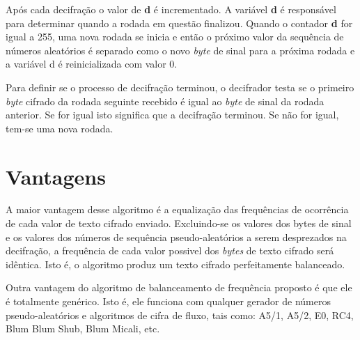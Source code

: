 Após cada decifração o valor de \textbf{d} é incrementado. A variável \textbf{d} é responsável para determinar quando a rodada em questão finalizou. Quando o contador \textbf{d} for igual a 255, uma nova rodada se inicia e então o próximo valor da sequência de números aleatórios é separado como o novo \textit{byte} de sinal para a próxima rodada e a variável d é reinicializada com valor 0.

Para definir se o processo de decifração terminou, o decifrador testa se o primeiro \textit{byte} cifrado da rodada seguinte recebido é igual ao \textit{byte} de sinal da rodada anterior. Se for igual isto significa que a decifração terminou. Se não for igual, tem-se uma nova rodada.

\section{Vantagens}

A maior vantagem desse algoritmo é a equalização das frequências de ocorrência de cada valor de texto cifrado enviado. Excluindo-se os valores dos bytes de sinal e os valores dos números de sequência pseudo-aleatórios a serem desprezados na decifração, a frequência de cada valor possivel dos \textit{bytes} de texto cifrado será idêntica. Isto é, o algoritmo produz um texto cifrado perfeitamente balanceado.

Outra vantagem do algoritmo de balanceamento de frequência proposto é que ele é totalmente genérico.  Isto é, ele funciona com qualquer gerador de números pseudo-aleatórios e algoritmos de cifra de fluxo, tais como: A5/1, A5/2, E0, RC4, Blum Blum Shub, Blum Micali, etc.